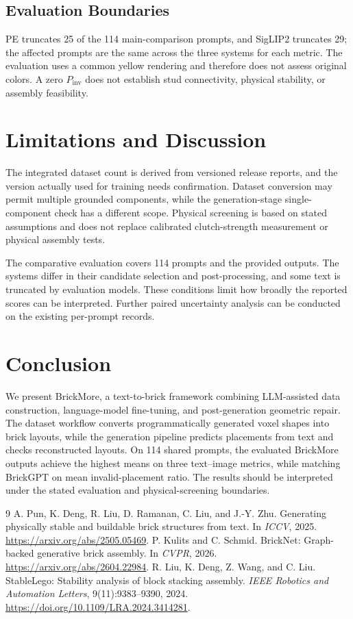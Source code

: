 \documentclass[10pt,twocolumn,letterpaper]{article}
\begin{document}
\subsection{Evaluation Boundaries}
PE truncates 25 of the 114 main-comparison prompts, and SigLIP2 truncates 29; the affected prompts are the same across the three systems for each metric. The evaluation uses a common yellow rendering and therefore does not assess original colors. A zero $P_{\mathrm{inv}}$ does not establish stud connectivity, physical stability, or assembly feasibility.

\section{Limitations and Discussion}
The integrated dataset count is derived from versioned release reports, and the version actually used for training needs confirmation. Dataset conversion may permit multiple grounded components, while the generation-stage single-component check has a different scope. Physical screening is based on stated assumptions and does not replace calibrated clutch-strength measurement or physical assembly tests.

The comparative evaluation covers 114 prompts and the provided outputs. The systems differ in their candidate selection and post-processing, and some text is truncated by evaluation models. These conditions limit how broadly the reported scores can be interpreted. Further paired uncertainty analysis can be conducted on the existing per-prompt records.

\section{Conclusion}
We present BrickMore, a text-to-brick framework combining LLM-assisted data construction, language-model fine-tuning, and post-generation geometric repair. The dataset workflow converts programmatically generated voxel shapes into brick layouts, while the generation pipeline predicts placements from text and checks reconstructed layouts. On 114 shared prompts, the evaluated BrickMore outputs achieve the highest means on three text--image metrics, while matching BrickGPT on mean invalid-placement ratio. The results should be interpreted under the stated evaluation and physical-screening boundaries.

\FloatBarrier
{\footnotesize
\begin{thebibliography}{9}
 A. Pun, K. Deng, R. Liu, D. Ramanan, C. Liu, and J.-Y. Zhu. Generating physically stable and buildable brick structures from text. In \emph{ICCV}, 2025. \url{https://arxiv.org/abs/2505.05469}.
 P. Kulits and C. Schmid. BrickNet: Graph-backed generative brick assembly. In \emph{CVPR}, 2026. \url{https://arxiv.org/abs/2604.22984}.
 R. Liu, K. Deng, Z. Wang, and C. Liu. StableLego: Stability analysis of block stacking assembly. \emph{IEEE Robotics and Automation Letters}, 9(11):9383--9390, 2024. \url{https://doi.org/10.1109/LRA.2024.3414281}.
\end{thebibliography}}
\clearpage
\onecolumn
\appendix
\end{document}
